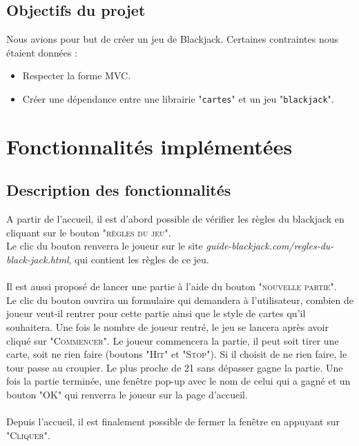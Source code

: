 \documentclass[french,12pt]{article}
\begin{document}
\subsection{Objectifs du projet} \label{objectifs}

Nous avions pour but de créer un jeu de Blackjack. Certaines contraintes nous étaient données :
\begin{itemize}
	\item Respecter la forme MVC.
	\item Créer une dépendance entre une librairie "\texttt{cartes}" et un jeu "\texttt{blackjack}".	
\end{itemize}

\section{Fonctionnalités implémentées} \label{organisation}

\subsection{Description des fonctionnalités}

A partir de l'accueil, il est d'abord possible de vérifier les règles du blackjack en cliquant sur le bouton "\textsc{règles du jeu}". \\
Le clic du bouton renverra le joueur sur le site \textit{guide-blackjack.com/regles-du-black-jack.html}, qui contient les règles de ce jeu. \\\\
Il est aussi proposé de lancer une partie à l'aide du bouton "\textsc{nouvelle partie}". \\
Le clic du bouton ouvrira un formulaire qui demandera à l'utilisateur, combien de joueur veut-il rentrer pour cette partie ainsi que le style de cartes qu'il souhaitera. Une fois le nombre de joueur rentré, le jeu se lancera après avoir cliqué sur "\textsc{Commencer}". Le joueur commencera la partie, il peut soit tirer une carte, soit ne rien faire (boutons  "\textsc{Hit}" et "\textsc{Stop}"). Si il choisit de ne rien faire, le tour passe au croupier. Le plus proche de 21 sans dépasser gagne la partie. Une fois la partie terminée, une fenêtre pop-up avec le nom de celui qui a gagné et un bouton "\textsc{OK}" qui renverra le joueur sur la page d'accueil.\\\\
Depuis l'accueil, il est finalement possible de fermer la fenêtre en appuyant sur "\textsc{Cliquer}". 
\end{document}

